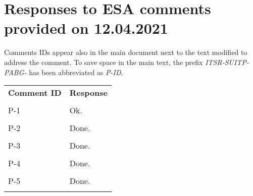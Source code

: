 
\section{Responses to ESA comments provided on 12.04.2021}
\label{sec:ESA:comments:1}

Comments IDs appear also in the main document next to the text modified to address the comment. To save space in the main text, the prefix \emph{ITSR-SUITP-PABG-} has been abbreviated as \emph{P-ID}.

\setlength\LTleft{0pt}
\setlength\LTright{0pt}
\footnotesize 
\begin{longtable}{|p{1.5cm}|p{12cm}|@{}}
\textbf{Comment ID}&\textbf{Response}\\
\\
\hline
P-1&
\begin{minipage}{12cm}
Ok.
\end{minipage}\\
\\
\hline
P-2&
\begin{minipage}{12cm}
Done.
\end{minipage}\\
\\
\hline

P-3&
\begin{minipage}{12cm}
Done.
\end{minipage}\\
\\
\hline

P-4&
\begin{minipage}{12cm}
Done.
\end{minipage}\\
\\
\hline

P-5&
\begin{minipage}{12cm}
Done.
\end{minipage}\\
\\
\hline
                                                
\end{longtable}
\normalsize

\clearpage